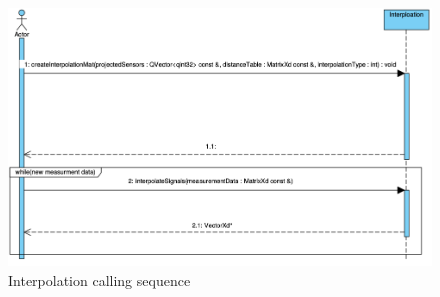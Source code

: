 \begin{figure}[h]
	\begin{center}
		\includegraphics[width=16cm]{figures/interpolation_calling_sequence.png}
		\caption{Interpolation calling sequence}
	\end{center}
\end{figure}

\clearpage
  


